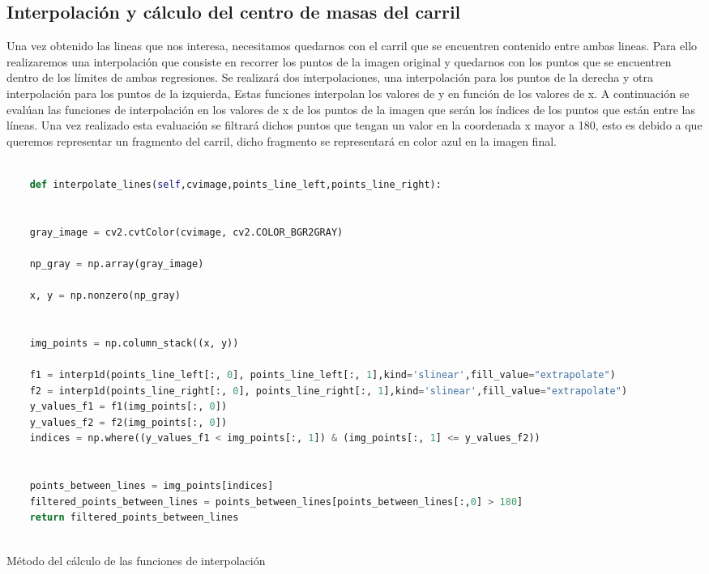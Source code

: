 \subsection{Interpolación y cálculo del centro de masas del carril}
\label{sec:Interpolación y cálculo del centro de masas del carril}

Una vez obtenido las lineas que nos interesa, necesitamos quedarnos con el carril que se encuentren contenido entre ambas lineas. Para ello realizaremos una interpolación que consiste en recorrer
los puntos de la imagen original y quedarnos con los puntos que se encuentren dentro de los límites de ambas regresiones. Se realizará dos interpolaciones, una interpolación para los puntos de la derecha
y otra interpolación para los puntos de la izquierda, Estas funciones interpolan los valores de y en función de los valores de x. 
A continuación se evalúan las funciones de interpolación en los valores de x de los puntos de la imagen que serán los índices de los puntos que están entre las líneas. Una vez realizado esta evaluación
se filtrará dichos puntos que tengan un valor en la coordenada x mayor a 180, esto es debido a que queremos representar un fragmento del carril, dicho fragmento se representará en color azul 
en la imagen final.

\begin{code}[h]
  \begin{lstlisting}[language=Python]

    def interpolate_lines(self,cvimage,points_line_left,points_line_right):


    gray_image = cv2.cvtColor(cvimage, cv2.COLOR_BGR2GRAY) 

    np_gray = np.array(gray_image)

    x, y = np.nonzero(np_gray)


    img_points = np.column_stack((x, y))

    f1 = interp1d(points_line_left[:, 0], points_line_left[:, 1],kind='slinear',fill_value="extrapolate")
    f2 = interp1d(points_line_right[:, 0], points_line_right[:, 1],kind='slinear',fill_value="extrapolate") 
    y_values_f1 = f1(img_points[:, 0])
    y_values_f2 = f2(img_points[:, 0])
    indices = np.where((y_values_f1 < img_points[:, 1]) & (img_points[:, 1] <= y_values_f2))
    
    
    points_between_lines = img_points[indices]
    filtered_points_between_lines = points_between_lines[points_between_lines[:,0] > 180]
    return filtered_points_between_lines
    

  \end{lstlisting}
  \caption[Método de interpolación]{Método del cálculo de las funciones de interpolación}
  \label{cod:codejemplo}
  \end{code}  

